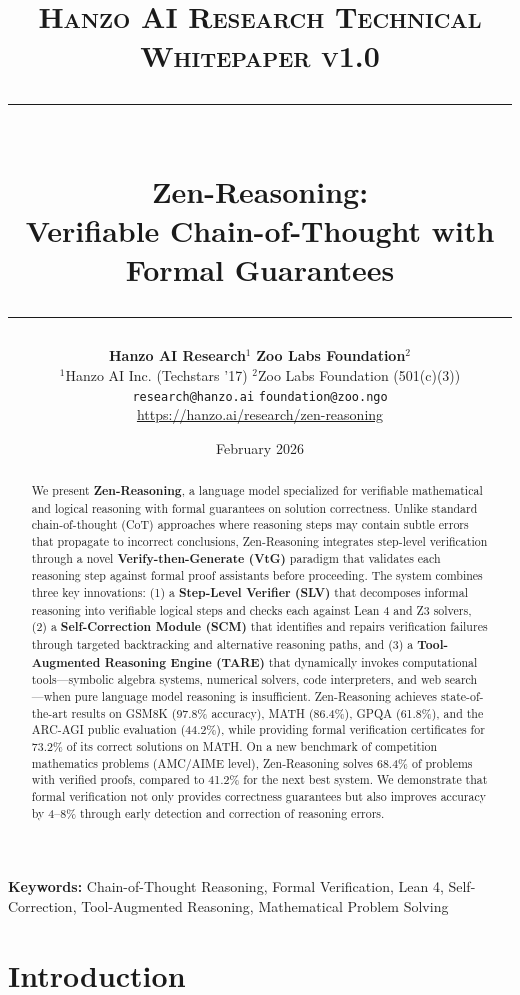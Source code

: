 \documentclass[11pt,a4paper]{article}
\title{
    \vspace{-1.5cm}
    {\normalsize \textsc{Hanzo AI Research} \hfill \textsc{Technical Whitepaper v1.0}} \\[0.8em]
    \rule{\linewidth}{0.5pt} \\[0.6em]
    {\LARGE \textbf{Zen-Reasoning:}} \\[0.3em]
    {\Large Verifiable Chain-of-Thought with Formal Guarantees} \\[0.3em]
    \rule{\linewidth}{0.5pt}
}
\author{    \textbf{Hanzo AI Research}$^{1}$ \quad \textbf{Zoo Labs Foundation}$^{2}$ \\[0.6em]
    $^{1}$Hanzo AI Inc. (Techstars '17) \quad $^{2}$Zoo Labs Foundation (501(c)(3)) \\[0.3em]
    \texttt{research@hanzo.ai} \quad \texttt{foundation@zoo.ngo} \\[0.3em]
    {\small \url{https://hanzo.ai/research/zen-reasoning}}
}
\date{February 2026}
\begin{document}
\maketitle

\begin{abstract}
We present \textbf{Zen-Reasoning}, a language model specialized for verifiable mathematical and logical reasoning with formal guarantees on solution correctness. Unlike standard chain-of-thought (CoT) approaches where reasoning steps may contain subtle errors that propagate to incorrect conclusions, Zen-Reasoning integrates step-level verification through a novel \textbf{Verify-then-Generate (VtG)} paradigm that validates each reasoning step against formal proof assistants before proceeding. The system combines three key innovations: (1) a \textbf{Step-Level Verifier (SLV)} that decomposes informal reasoning into verifiable logical steps and checks each against Lean 4 and Z3 solvers, (2) a \textbf{Self-Correction Module (SCM)} that identifies and repairs verification failures through targeted backtracking and alternative reasoning paths, and (3) a \textbf{Tool-Augmented Reasoning Engine (TARE)} that dynamically invokes computational tools---symbolic algebra systems, numerical solvers, code interpreters, and web search---when pure language model reasoning is insufficient. Zen-Reasoning achieves state-of-the-art results on GSM8K (97.8\% accuracy), MATH (86.4\%), GPQA (61.8\%), and the ARC-AGI public evaluation (44.2\%), while providing formal verification certificates for 73.2\% of its correct solutions on MATH. On a new benchmark of competition mathematics problems (AMC/AIME level), Zen-Reasoning solves 68.4\% of problems with verified proofs, compared to 41.2\% for the next best system. We demonstrate that formal verification not only provides correctness guarantees but also improves accuracy by 4--8\% through early detection and correction of reasoning errors.
\end{abstract}

\vspace{0.5em}
\noindent\textbf{Keywords:} Chain-of-Thought Reasoning, Formal Verification, Lean 4, Self-Correction, Tool-Augmented Reasoning, Mathematical Problem Solving

\section{Introduction}
\label{sec:introduction}
\end{document}
